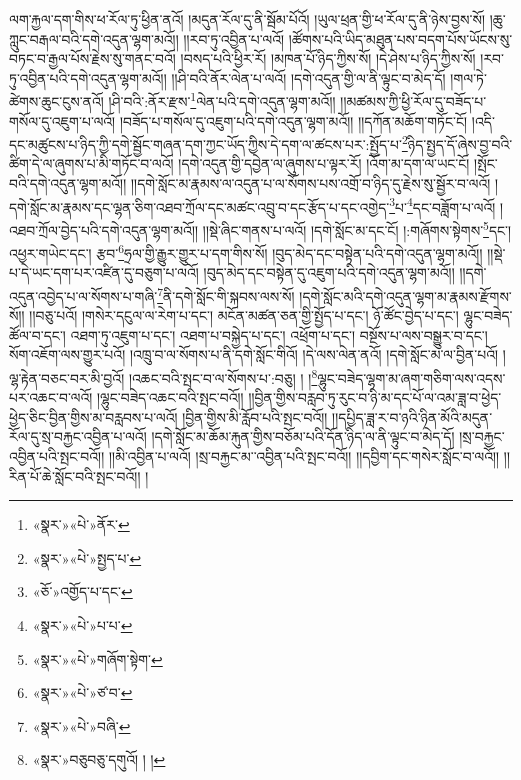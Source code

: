 ལག་རྐྱལ་དག་གིས་ཕ་རོལ་ཏུ་ཕྱིན་ནའོ། །མདུན་རོལ་དུ་ནི་སྦོམ་པོའོ། །ཡུལ་ཕྲན་གྱི་ཕ་རོལ་དུ་ནི་ཉེས་བྱས་སོ། །ཆུ་ཀླུང་བརྒལ་བའི་དགེ་འདུན་ལྷག་མའོ།། །།རབ་ཏུ་འབྱིན་པ་ལའོ། །ཚོགས་པའི་ཡིད་མཐུན་པས་བདག་པོས་ཡོངས་སུ་བཏང་བ་རྒྱལ་པོས་རྗེས་སུ་གནང་བའོ། །བསད་པའི་ཕྱིར་རོ། །མཁན་པོ་ཉིད་ཀྱིས་སོ། །དེ་ཤེས་པ་ཉིད་ཀྱིས་སོ། །རབ་ཏུ་འབྱིན་པའི་དགེ་འདུན་ལྷག་མའོ།། །།ཤི་བའི་ནོར་ལེན་པ་ལའོ། །དགེ་འདུན་གྱི་ལ་ནི་ལྟུང་བ་མེད་དོ། །གལ་ཏེ་ཚེགས་ཆུང་ངུས་ནའོ། །ཤི་བའི་:ནོར་རྫས་\footnote{«སྣར་»«པེ་»ནོར་}ལེན་པའི་དགེ་འདུན་ལྷག་མའོ།། །།མཚམས་ཀྱི་ཕྱི་རོལ་དུ་བཟོད་པ་གསོལ་དུ་འཇུག་པ་ལའོ། །བཟོད་པ་གསོལ་དུ་འཇུག་པའི་དགེ་འདུན་ལྷག་མའོ།། །།དཀོན་མཆོག་གཏོང་ངོ། །འདི་དང་མཚུངས་པ་ཉིད་ཀྱི་དགེ་སྦྱོང་གཞན་དག་ཀྱང་ཡོད་ཀྱིས་དེ་དག་ལ་ཚངས་པར་:སྤྱོད་པ་\footnote{«སྣར་»«པེ་»སྤྱད་པ་}ཉིད་སྤྱད་དོ་ཞེས་བྱ་བའི་ཚིག་དེ་ལ་ཞུགས་པ་མི་གཏོང་བ་ལའོ། །དགེ་འདུན་གྱི་དབྱེན་ལ་ཞུགས་པ་ལྟར་རོ། །འོག་མ་དག་ལ་ཡང་ངོ། །སྤོང་བའི་དགེ་འདུན་ལྷག་མའོ།། །།དགེ་སློང་མ་རྣམས་ལ་འདུན་པ་ལ་སོགས་པས་འགྲོ་བ་ཉིད་དུ་རྗེས་སུ་སྦྱོར་བ་ལའོ། །དགེ་སློང་མ་རྣམས་དང་ལྷན་ཅིག་འཐབ་ཀྲོལ་དང་མཚང་འབྲུ་བ་དང་རྩོད་པ་དང་འགྱེད་\footnote{«ཅོ་»འགྱོད་པ་དང་}པ་\footnote{«སྣར་»«པེ་»པ་པ་}དང་བཟློག་པ་ལའོ། །འཐབ་ཀྲོལ་བྱེད་པའི་དགེ་འདུན་ལྷག་མའོ།། །།སྡེ་ཞིང་གནས་པ་ལའོ། །དགེ་སློང་མ་དང་ངོ། །:གཞོགས་སྟེགས་\footnote{«སྣར་»«པེ་»གཞོག་སྟེག་}དང་། འཕྱར་གཡེང་དང་། རྩབ་\footnote{«སྣར་»«པེ་»ཙ་བ་}ཧྲལ་གྱི་རྒྱུར་གྱུར་པ་དག་གིས་སོ། །བུད་མེད་དང་བསྟེན་པའི་དགེ་འདུན་ལྷག་མའོ།། །།སྡེ་པ་དེ་ཡང་དག་པར་འཛིན་དུ་བཅུག་པ་ལའོ། །བུད་མེད་དང་བསྟེན་དུ་འཇུག་པའི་དགེ་འདུན་ལྷག་མའོ།། །།དགེ་འདུན་འབྱེད་པ་ལ་སོགས་པ་གཞི་\footnote{«སྣར་»«པེ་»བཞི་}ནི་དགེ་སློང་གི་སྐབས་ལས་སོ། །དགེ་སློང་མའི་དགེ་འདུན་ལྷག་མ་རྣམས་རྫོགས་སོ།། །།བཅུ་པའོ། །གསེར་དངུལ་ལ་རེག་པ་དང་། མངོན་མཚན་ཅན་གྱི་སྤྱོད་པ་དང་། ཉོ་ཚོང་བྱེད་པ་དང་། ལྷུང་བཟེད་ཚོལ་བ་དང་། འཐག་ཏུ་འཇུག་པ་དང་། འཐག་པ་བསྐྱེད་པ་དང་། འཕྲོག་པ་དང་། བསྔོས་པ་ལས་བསྒྱུར་བ་དང་། སོག་འཇོག་ལས་གྱུར་པའོ། །འཁྲུ་བ་ལ་སོགས་པ་ནི་དགེ་སློང་གིའོ། །དེ་ལས་ལེན་ནའོ། །དགེ་སློང་མ་ལ་བྱིན་པའོ། །ལྷ་རྟེན་བཅང་བར་མི་བྱའོ། །འཆང་བའི་སྤང་བ་ལ་སོགས་པ་:བཅུ། ། །\footnote{«སྣར་»བཅུབཅུ་དགུའོ། ། །}ལྷུང་བཟེད་ལྷག་མ་ཞག་གཅིག་ལས་འདས་པར་འཆང་བ་ལའོ། །ལྷུང་བཟེད་འཆང་བའི་སྤང་བའོ།། །།བྱིན་གྱིས་བརླབ་ཏུ་རུང་བ་ཉི་མ་དང་པོ་ལ་འམ་ཟླ་བ་ཕྱེད་ཕྱེད་ཅིང་བྱིན་གྱིས་མ་བརླབས་པ་ལའོ། །བྱིན་གྱིས་མི་རློབ་པའི་སྤང་བའོ།། །།དཔྱིད་ཟླ་ར་བ་ཉའི་ཉིན་མོའི་མདུན་རོལ་དུ་སྲ་བརྐྱང་འབྱིན་པ་ལའོ། །དགེ་སློང་མ་ཆོམ་རྐུན་གྱིས་བཅོམ་པའི་དོན་ཉིད་ལ་ནི་ལྟུང་བ་མེད་དོ། །སྲ་བརྐྱང་འབྱིན་པའི་སྤང་བའོ།། །།མི་འབྱིན་པ་ལའོ། །སྲ་བརྐྱང་མ་་འབྱིན་པའི་སྤང་བའོ།། །།དབྱིག་དང་གསེར་སློང་བ་ལའོ།། །།རིན་པོ་ཆེ་སློང་བའི་སྤང་བའོ།། །
